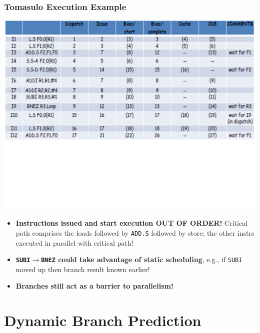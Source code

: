 \documentclass{beamer}
\newcommand{\emp}[1]{\textcolor{DikuRed}{ #1}}
\newcommand{\emphh}[1]{\textcolor{CosGreen}{ #1}}
\begin{document}
\begin{frame}[fragile,t]
\frametitle{Tomasulo Execution Example}

\includegraphics[width=64ex]{FigsOoOProc/TomasuloEg.pdf}
\vspace{-19ex}

\begin{itemize}
    \item \emphh{\bf Instructions issued and start execution OUT OF ORDER!}
            Critical path\pause {\tt~} comprises the loads followed by {\tt ADD.S}
            followed by store; the other instrs executed in parallel with critical path! 
    \item \emp{\bf {\tt SUBI$\rightarrow$BNEZ} could take advantage of static scheduling}\pause, 
                e.g., if {\tt SUBI} moved up then branch result 
                known earlier!
    \item \alert{\bf Branches still act as a barrier to parallelism!} 
\end{itemize}
\end{frame}

\section{Dynamic Branch Prediction}

\begin{frame}[fragile]
	\tableofcontents[currentsection]
\end{frame}
\end{document}

